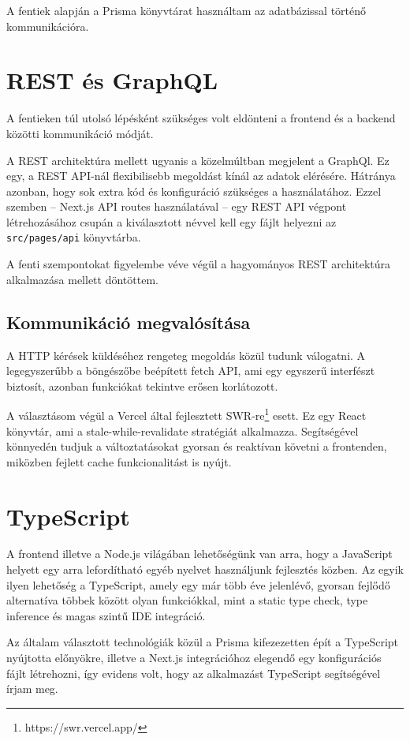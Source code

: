 A fentiek alapján a Prisma könyvtárat használtam az adatbázissal történő kommunikációra.

\section{REST és GraphQL}

A fentieken túl utolsó lépésként szükséges volt eldönteni a frontend és a backend közötti kommunikáció módját.

A REST architektúra mellett ugyanis a közelmúltban megjelent a GraphQl. Ez egy, a REST API-nál flexibilisebb megoldást
kínál az adatok elérésére. Hátránya azonban, hogy sok extra kód és konfiguráció szükséges a használatához.
Ezzel szemben -- Next.js API routes használatával -- egy REST API végpont létrehozásához csupán a kiválasztott névvel kell egy fájlt
helyezni az \lstinline|src/pages/api| könyvtárba.

A fenti szempontokat figyelembe véve végül a hagyományos REST architektúra alkalmazása mellett döntöttem.

\subsection{Kommunikáció megvalósítása}

A HTTP kérések küldéséhez rengeteg megoldás közül tudunk válogatni.
A legegyszerűbb a böngészőbe beépített fetch API, ami egy egyszerű interfészt biztosít, azonban funkciókat tekintve erősen korlátozott.

A választásom végül a Vercel által fejlesztett SWR-re\footnote{https://swr.vercel.app/} esett. Ez egy React könyvtár, ami a stale-while-revalidate
stratégiát alkalmazza. Segítségével könnyedén tudjuk a változtatásokat gyorsan és reaktívan követni a frontenden, miközben fejlett cache
funkcionalitást is nyújt.

\section{TypeScript}
A frontend illetve a Node.js világában lehetőségünk van arra, hogy a JavaScript helyett egy arra lefordítható
egyéb nyelvet használjunk fejlesztés közben. Az egyik ilyen lehetőség a TypeScript, amely egy már több éve jelenlévő,
gyorsan fejlődő alternatíva többek között olyan funkciókkal, mint a static type check, type inference és magas szintű IDE
integráció.

Az általam választott technológiák közül a Prisma kifezezetten épít a TypeScript nyújtotta előnyökre, illetve a Next.js
integrációhoz elegendő egy konfigurációs fájlt létrehozni, így evidens volt, hogy az alkalmazást TypeScript segítségével írjam meg.
